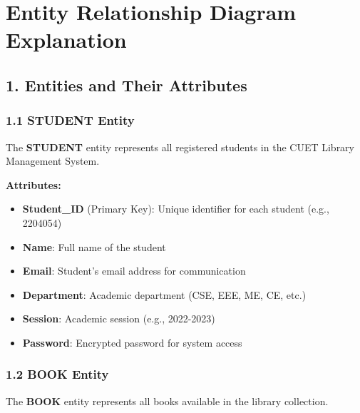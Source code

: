 \documentclass[12pt,a4paper]{article}
\begin{document}
\begin{center}
\end{center}

\newpage

\section{Entity Relationship Diagram Explanation}

\subsection{1. Entities and Their Attributes}

\subsubsection{1.1 STUDENT Entity}
The \textbf{STUDENT} entity represents all registered students in the CUET Library Management System.

\textbf{Attributes:}
\begin{itemize}
    \item \textbf{Student\_ID} (Primary Key): Unique identifier for each student (e.g., 2204054)
    \item \textbf{Name}: Full name of the student
    \item \textbf{Email}: Student's email address for communication
    \item \textbf{Department}: Academic department (CSE, EEE, ME, CE, etc.)
    \item \textbf{Session}: Academic session (e.g., 2022-2023)
    \item \textbf{Password}: Encrypted password for system access
\end{itemize}

\subsubsection{1.2 BOOK Entity}
The \textbf{BOOK} entity represents all books available in the library collection.
\end{document}
